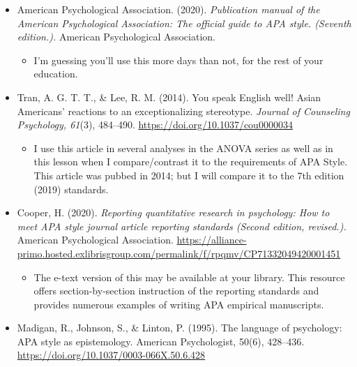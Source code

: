 \documentclass[
  11pt,
]{book}
\providecommand{\tightlist}{%
  \setlength{\itemsep}{0pt}\setlength{\parskip}{0pt}}
\begin{document}
\begin{itemize}
\tightlist
\item
  American Psychological Association. (2020). \emph{Publication manual of the American Psychological Association: The official guide to APA style. (Seventh edition.).} American Psychological Association.

  \begin{itemize}
  \tightlist
  \item
    I'm guessing you'll use this more days than not, for the rest of your education.
  \end{itemize}
\item
  Tran, A. G. T. T., \& Lee, R. M. (2014). You speak English well! Asian Americans' reactions to an exceptionalizing stereotype. \emph{Journal of Counseling Psychology, 61}(3), 484--490. \url{https://doi.org/10.1037/cou0000034}

  \begin{itemize}
  \tightlist
  \item
    I use this article in several analyses in the ANOVA series as well as in this lesson when I compare/contrast it to the requirements of APA Style. This article was pubbed in 2014; but I will compare it to the 7th edition (2019) standards.
  \end{itemize}
\item
  Cooper, H. (2020). \emph{Reporting quantitative research in psychology: How to meet APA style journal article reporting standards (Second edition, revised.).} American Psychological Association. \url{https://alliance-primo.hosted.exlibrisgroup.com/permalink/f/rpqmv/CP71332049420001451}

  \begin{itemize}
  \tightlist
  \item
    The e-text version of this may be available at your library. This resource offers section-by-section instruction of the reporting standards and provides numerous examples of writing APA empirical manuscripts.
  \end{itemize}
\item
  Madigan, R., Johnson, S., \& Linton, P. (1995). The language of psychology: APA style as epistemology. American Psychologist, 50(6), 428--436. \url{https://doi.org/10.1037/0003-066X.50.6.428}


\end{itemize}
\end{document}
